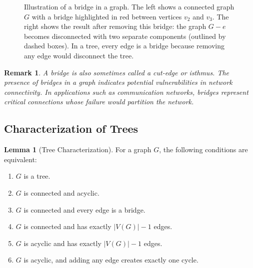 \documentclass{article}
\newtheorem{remark}{Remark}
\theoremstyle{definition}
\newtheorem{lemma}{Lemma}
\begin{document}
\begin{figure}[h]
\caption{Illustration of a bridge in a graph. The left shows a connected graph $G$ with a bridge highlighted in red between vertices $v_2$ and $v_3$. The right shows the result after removing this bridge: the graph $G - e$ becomes disconnected with two separate components (outlined by dashed boxes). In a tree, every edge is a bridge because removing any edge would disconnect the tree.}
\label{fig:bridge-example}
\end{figure}

\begin{remark}
A bridge is also sometimes called a cut-edge or isthmus. The presence of bridges in a graph indicates potential vulnerabilities in network connectivity. In applications such as communication networks, bridges represent critical connections whose failure would partition the network.
\end{remark}

\subsection{Characterization of Trees}\label{subsec:tree-characterization}

\begin{lemma}[Tree Characterization]
For a graph $G$, the following conditions are equivalent:
\begin{enumerate}
    \item $G$ is a tree.
    \item $G$ is connected and acyclic.
    \item $G$ is connected and every edge is a bridge.
    \item $G$ is connected and has exactly $|V(G)| - 1$ edges.
    \item $G$ is acyclic and has exactly $|V(G)| - 1$ edges.
    \item $G$ is acyclic, and adding any edge creates exactly one cycle.
\end{enumerate}
\end{lemma}
\end{document}

